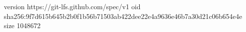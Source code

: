 version https://git-lfs.github.com/spec/v1
oid sha256:9f7d615b645b2b0f1b56b71503ab422dee22e4a9636e46b7a30d21c06b654e4e
size 1048672
